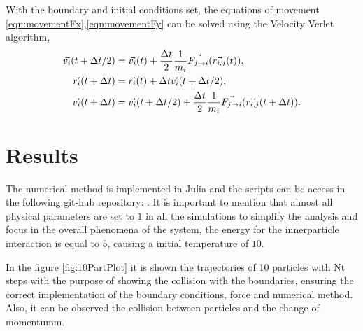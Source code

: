 \documentclass[main.tex]{subfiles}
\begin{document}
With the boundary and initial conditions set, the equations of movement \eqref{eqn:movementFx},\eqref{eqn:movementFy} can be solved using the Velocity Verlet algorithm,
\begin{align}
    \vec{v_{i}}\qty(t+\Delta t/2) &= \vec{v_{i}}\qty(t) + \frac{\Delta t}{2}\frac{1}{m_{i}}\vec{F_{j\to i}}\qty(\vec{r_{i,j}}\qty(t)), \\
    \vec{r_{i}}\qty(t+\Delta t) &= \vec{r_{i}}\qty(t) + \Delta t \vec{v_{i}}\qty(t+\Delta t/2), \\
    \vec{v_{i}}\qty(t+\Delta t) &= \vec{v_{i}}\qty(t+\Delta t/2) + \frac{\Delta t}{2}\frac{1}{m_{i}}\vec{F_{j\to i}}\qty(\vec{r_{i,j}}\qty(t+\Delta t)).
\end{align}



\section{Results}

The numerical method is implemented in Julia and the scripts can be access in the following git-hub repository: \href{https://github.com/FranVT/NanoTech-Masters}{\color{blue}{FranVT Repository}} .
It is important to mention that almost all physical parameters are set to $1$ in all the simulations to simplify the analysis and focus in the overall phenomena of the system, the energy for the innerparticle interaction is equal to $5$, causing a initial temperature of $10$.

In the figure \ref{fig:10PartPlot}
it is shown the trajectories of 10 particles with Nt steps with the purpose of showing the collision with the boundaries, ensuring the correct implementation of the boundary conditions, force and numerical method.
Also, it can be observed the collision between particles and the change of momentumm.
\end{document}
